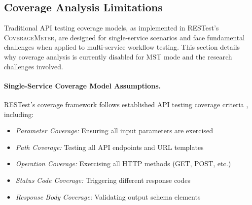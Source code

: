 \documentclass[conference]{IEEEtran}
\begin{document}

\subsection{Coverage Analysis Limitations}\label{sec:coverage-limitations}

Traditional API testing coverage models, as implemented in RESTest's \textsc{CoverageMeter}, are designed for single-service scenarios and face fundamental challenges when applied to multi-service workflow testing. This section details why coverage analysis is currently disabled for MST mode and the research challenges involved.

\paragraph{Single-Service Coverage Model Assumptions.}
RESTest's coverage framework follows established API testing coverage criteria \cite{martin2019restest}, including:
\begin{itemize}[leftmargin=*]
    \item \textit{Parameter Coverage:} Ensuring all input parameters are exercised
    \item \textit{Path Coverage:} Testing all API endpoints and URL templates  
    \item \textit{Operation Coverage:} Exercising all HTTP methods (GET, POST, etc.)
    \item \textit{Status Code Coverage:} Triggering different response codes
    \item \textit{Response Body Coverage:} Validating output schema elements
\end{itemize}
\end{document}
